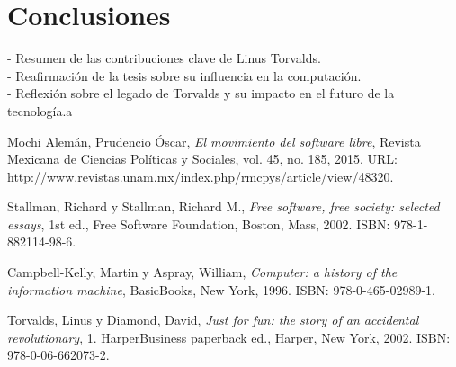 \documentclass[a4paper,12pt]{article}
\begin{document}
\section{Conclusiones} 
- Resumen de las contribuciones clave de Linus
Torvalds.\\ 
- Reafirmación de la tesis sobre su influencia en la computación.\\

- Reflexión sobre el legado de Torvalds y su impacto en el futuro de la
tecnología.a
\newpage

\begin{thebibliography}{9}

Mochi Alemán, Prudencio Óscar, \textit{El movimiento del software libre}, Revista Mexicana de Ciencias Políticas y Sociales, vol. 45, no. 185, 2015. URL: \url{http://www.revistas.unam.mx/index.php/rmcpys/article/view/48320}.

Stallman, Richard y Stallman, Richard M., \textit{Free software, free society: selected essays}, 1st ed., Free Software Foundation, Boston, Mass, 2002. ISBN: 978-1-882114-98-6.

Campbell-Kelly, Martin y Aspray, William, \textit{Computer: a history of the information machine}, BasicBooks, New York, 1996. ISBN: 978-0-465-02989-1.

Torvalds, Linus y Diamond, David, \textit{Just for fun: the story of an accidental revolutionary}, 1. HarperBusiness paperback ed., Harper, New York, 2002. ISBN: 978-0-06-662073-2.

\end{thebibliography}
\end{document}
